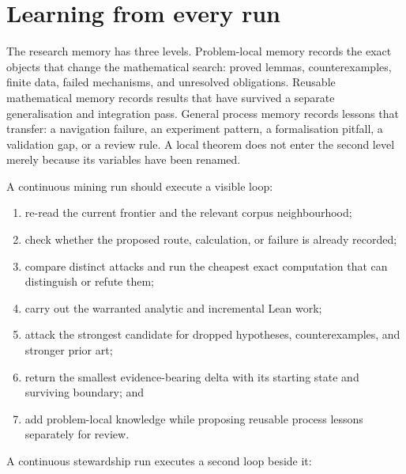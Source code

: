 \documentclass[10pt]{article}
\begin{document}
\section{Learning from every run}\label{sec:learning}

The research memory has three levels.  Problem-local memory records the exact
objects that change the mathematical search: proved lemmas, counterexamples,
finite data, failed mechanisms, and unresolved obligations.  Reusable
mathematical memory records results that have survived a separate
generalisation and integration pass.  General process memory records lessons
that transfer: a navigation failure, an experiment pattern, a formalisation
pitfall, a validation gap, or a review rule.  A local theorem does not enter
the second level merely because its variables have been renamed.

A continuous mining run should execute a visible loop:

\begin{enumerate}
\item re-read the current frontier and the relevant corpus neighbourhood;
\item check whether the proposed route, calculation, or failure is already
      recorded;
\item compare distinct attacks and run the cheapest exact computation that can
      distinguish or refute them;
\item carry out the warranted analytic and incremental Lean work;
\item attack the strongest candidate for dropped hypotheses, counterexamples,
      and stronger prior art;
\item return the smallest evidence-bearing delta with its starting state and
      surviving boundary; and
\item add problem-local knowledge while proposing reusable process lessons
      separately for review.
\end{enumerate}

A continuous stewardship run executes a second loop beside it:
\end{document}
